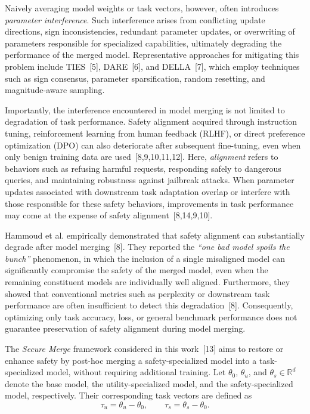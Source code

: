 Naively averaging model weights or task vectors, however, often introduces \emph{parameter interference}. Such interference arises from conflicting update directions, sign inconsistencies, redundant parameter updates, or overwriting of parameters responsible for specialized capabilities, ultimately degrading the performance of the merged model. Representative approaches for mitigating this problem include TIES~[5], DARE~[6], and DELLA~[7], which employ techniques such as sign consensus, parameter sparsification, random resetting, and magnitude-aware sampling.

Importantly, the interference encountered in model merging is not limited to degradation of task performance. Safety alignment acquired through instruction tuning, reinforcement learning from human feedback (RLHF), or direct preference optimization (DPO) can also deteriorate after subsequent fine-tuning, even when only benign training data are used~[8,9,10,11,12]. Here, \emph{alignment} refers to behaviors such as refusing harmful requests, responding safely to dangerous queries, and maintaining robustness against jailbreak attacks. When parameter updates associated with downstream task adaptation overlap or interfere with those responsible for these safety behaviors, improvements in task performance may come at the expense of safety alignment~[8,14,9,10].

Hammoud et al. empirically demonstrated that safety alignment can substantially degrade after model merging~[8]. They reported the \emph{``one bad model spoils the bunch''} phenomenon, in which the inclusion of a single misaligned model can significantly compromise the safety of the merged model, even when the remaining constituent models are individually well aligned. Furthermore, they showed that conventional metrics such as perplexity or downstream task performance are often insufficient to detect this degradation~[8]. Consequently, optimizing only task accuracy, loss, or general benchmark performance does not guarantee preservation of safety alignment during model merging.

The \emph{Secure Merge} framework considered in this work~[13] aims to restore or enhance safety by post-hoc merging a safety-specialized model into a task-specialized model, without requiring additional training. Let $\theta_0$, $\theta_u$, and $\theta_s \in \mathbb{R}^d$ denote the base model, the utility-specialized model, and the safety-specialized model, respectively. Their corresponding task vectors are defined as
\[
\tau_u=\theta_u-\theta_0,\qquad
\tau_s=\theta_s-\theta_0.
\]

